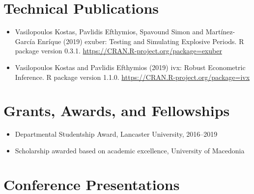 \documentclass[10pt,]{article}
\begin{document}
              \hypertarget{technical-publications}{%
              \section{Technical
              Publications}\label{technical-publications}}

              \begin{itemize}
              \item
                Vasilopoulos Kostas, Pavlidis Efthymios, Spavound Simon
                and Martínez-García Enríque (2019) exuber: Testing and
                Simulating Explosive Periods. R package version 0.3.1.
                \url{https://CRAN.R-project.org/package=exuber}
              \item
                Vasilopoulos Kostas and Pavlidis Efthymios (2019) ivx:
                Robust Econometric Inference. R package version 1.1.0.
                \url{https://CRAN.R-project.org/package=ivx}
              \end{itemize}

              \hypertarget{grants-awards-and-fellowships}{%
              \section{Grants, Awards, and
              Fellowships}\label{grants-awards-and-fellowships}}

              \begin{itemize}
              \item
                Departmental Studentship Award, Lancaster University,
                2016--2019
              \item
                Scholarship awarded based on academic excellence,
                University of Macedonia
              \end{itemize}

              \hypertarget{conference-presentations}{%
              \section{Conference
              Presentations}\label{conference-presentations}}
\end{document}
